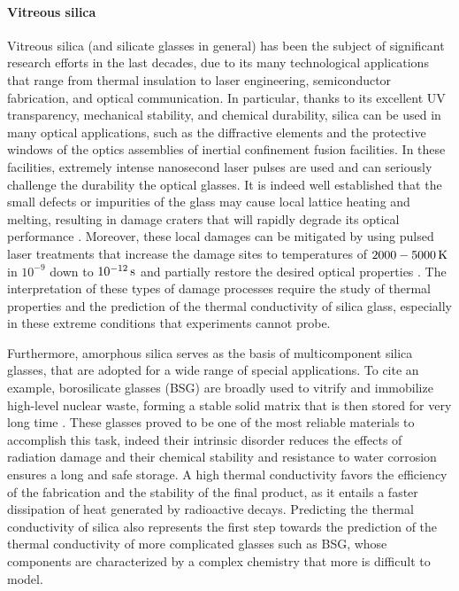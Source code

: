 \paragraph{Vitreous silica}
Vitreous silica (and silicate glasses in general) has been the subject of significant research efforts in the last decades, due to its many technological applications that range from thermal insulation to laser engineering, semiconductor fabrication, and optical communication.
In particular, thanks to its excellent UV transparency, mechanical stability, and chemical durability, silica can be used in many optical applications, such as the diffractive elements and the protective windows of the optics assemblies of inertial confinement fusion facilities. In these facilities, extremely intense nanosecond laser pulses are used and can seriously challenge the durability the optical glasses. It is indeed well established that the small defects or impurities of the glass may cause local lattice heating and melting, resulting in damage craters that will rapidly degrade its optical performance \cite{Miller2004,Canaud2004,Miller2010,Chambonneau2014,Kuzuu1999,Stuart1995,Wong2006,Carr2010,Saito2000}. Moreover, these local damages can be mitigated by using pulsed laser treatments that increase the damage sites to temperatures of $2000-5000\,\mathrm{K}$ in $10^{-9}$ down to $10^{-12}\,\mathrm{s}$ and partially restore the desired optical properties \cite{Soules2011}. 
The interpretation of these types of damage processes require the study of thermal properties and the prediction of the thermal conductivity of silica glass, especially in these extreme conditions that experiments cannot probe.

Furthermore, amorphous silica serves as the basis of multicomponent silica glasses, that are adopted for a wide range of special applications. 
To cite an example, borosilicate glasses (BSG) are broadly used to vitrify and immobilize high-level nuclear waste, forming a stable solid matrix that is then stored for very long time \cite{OjovanBook13}. These glasses proved to be one of the most reliable materials to accomplish this task, indeed their intrinsic disorder reduces the effects of radiation damage and their chemical stability and resistance to water corrosion ensures a long and safe storage. A high thermal conductivity favors the efficiency of the fabrication and the stability of the final product, as it entails a faster dissipation of heat generated by radioactive decays. 
Predicting the thermal conductivity of silica also represents the first step towards the prediction of the thermal conductivity of more complicated glasses such as BSG, whose components are characterized by a complex chemistry that more is difficult to model. 



